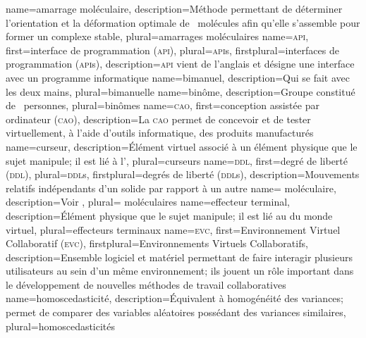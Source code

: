%
{%
	name={amarrage moléculaire},%
	description={Méthode permettant de déterminer l'orientation et la déformation optimale de ~molécules afin qu'elle s'assemble pour former un complexe stable},%
	plural={amarrages moléculaires}%
}
%
{%
	name={\textsc{api}},%
	first={interface de programmation (\textsc{api})},%
	plural={\textsc{api}s},%
	firstplural={interfaces de programmation (\textsc{api}s)},%
	description={\textsc{api} vient de l'anglais  et désigne une interface avec un programme informatique}%
}
%
{%
	name={bimanuel},%
	description={Qui se fait avec les deux mains},%
	plural={bimanuelle}%
}
%
{%
	name={binôme},%
	description={Groupe constitué de ~personnes},%
	plural={binômes}%
}
%
{%
	name={\textsc{cao}},%
	first={conception assistée par ordinateur (\textsc{cao})},%
	description={La \textsc{cao} permet de concevoir et de tester virtuellement, à l'aide d'outils informatique, des produits manufacturés}%
}
%
{%
	name={curseur},%
	description={Élément virtuel associé à un élément physique que le sujet manipule; il est lié à l'},%
	plural={curseurs}%
}
%
{%
	name={\textsc{ddl}},%
	first={degré de liberté (\textsc{ddl})},%
	plural={\textsc{ddl}s},%
	firstplural={degrés de liberté (\textsc{ddl}s)},%
	description={Mouvements relatifs indépendants d'un solide par rapport à un autre}%
}
%
{%
	name={ moléculaire},%
	description={Voir },%
	plural={ moléculaires}%
}
%
{%
	name={effecteur terminal},%
	description={Élément physique que le sujet manipule; il est lié au  du monde virtuel},%
	plural={effecteurs terminaux}%
}
%
{%
	name={\textsc{evc}},%
	first={Environnement Virtuel Collaboratif (\textsc{evc})},%
	firstplural={Environnements Virtuels Collaboratifs},%
	description={Ensemble logiciel et matériel permettant de faire interagir plusieurs utilisateurs au sein d'un même environnement; ils jouent un rôle important dans le développement de nouvelles méthodes de travail collaboratives}%
}
%
{%
	name={homoscedasticité},%
	description={Équivalent à homogénéité des variances; permet de comparer des variables aléatoires possédant des variances similaires},%
	plural={homoscedasticités}%
}
